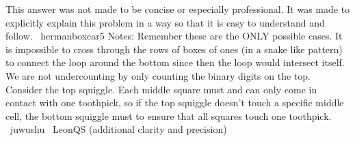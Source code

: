\documentclass[12pt]{article}
\begin{document}
This answer was not made to be concise or especially professional. It was made to explicitly explain this problem in a way so that it is easy to understand and follow. ~hermanboxcar5 Notes:
Remember these are the ONLY possible cases. It is impossible to cross through the rows of boxes of ones (in a snake like pattern) to connect the loop around the bottom since then the loop would intersect itself. We are not undercounting by only counting the binary digits on the top. Consider the top squiggle. Each middle square must and can only come in contact with one toothpick, so if the top squiggle doesn't touch a specific middle cell, the bottom squiggle must to ensure that all squares touch one toothpick.
~juwushu ~LeonQS (additional clarity and precision)
\end{document}
